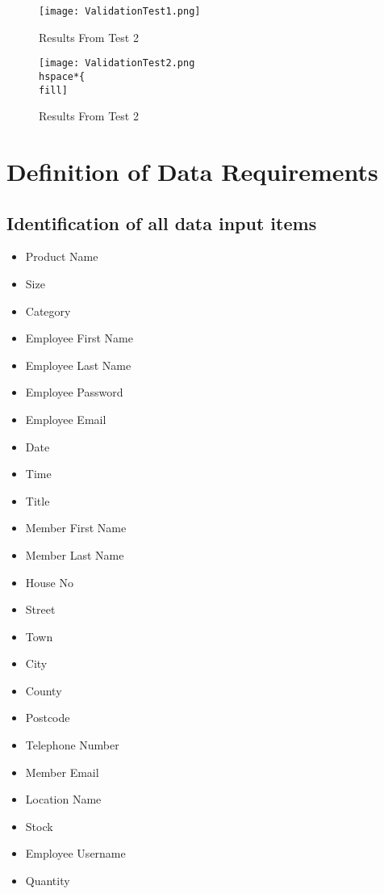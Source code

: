 \begin{python}
\begin{figure}[H]
\caption{Results From Test 2} \label{fig:Results From Test 2}
\hfill\texttt{[image: ValidationTest1.png]}\hspace*{\fill}
\end{figure}

\begin{figure}[H]
\caption{Results From Test 2} \label{fig:Results From Test 2}
\hfill\texttt{[image: ValidationTest2.png\\hspace*\{\\fill]}
\end{figure}


\section{Definition of Data Requirements}

\subsection{Identification of all data input items}

\begin{itemize}
\item Product Name
\item Size
\item Category
\item Employee First Name
\item Employee Last Name
\item Employee Password
\item Employee Email
\item Date
\item Time
\item Title
\item Member First Name
\item Member Last Name
\item House No
\item Street
\item Town
\item City
\item County
\item Postcode
\item Telephone Number
\item Member Email
\item Location Name
\item Stock
\item Employee Username
\item Quantity
\end{itemize}


\end{python}
